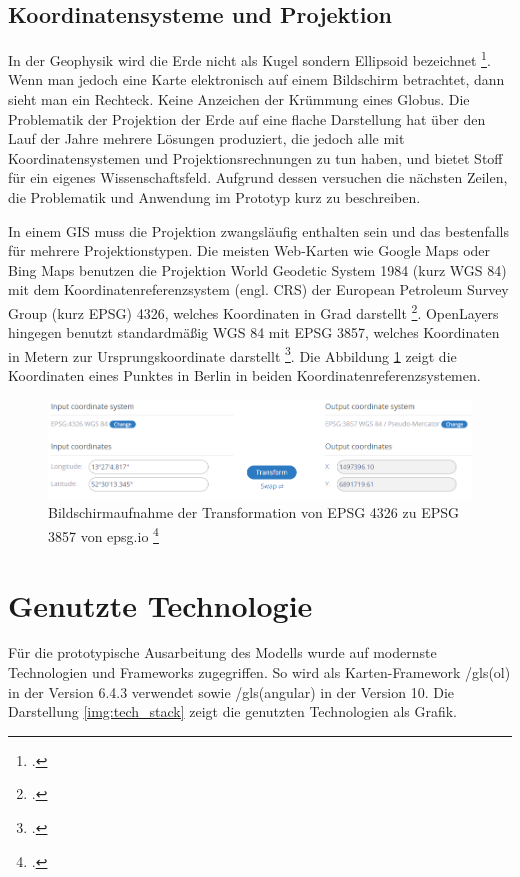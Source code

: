 \subsection{Koordinatensysteme und Projektion}
In der Geophysik wird die Erde nicht als Kugel sondern Ellipsoid bezeichnet \footcite{jung_figur_1956}.
Wenn man jedoch eine Karte elektronisch auf einem Bildschirm betrachtet, dann sieht man ein Rechteck.
Keine Anzeichen der Krümmung eines Globus.
Die Problematik der Projektion der Erde auf eine flache Darstellung hat über den Lauf der Jahre mehrere Lösungen produziert, die jedoch alle mit Koordinatensystemen und Projektionsrechnungen zu tun haben, und bietet Stoff für ein eigenes Wissenschaftsfeld.
Aufgrund dessen versuchen die nächsten Zeilen, die Problematik und Anwendung im Prototyp kurz zu beschreiben.

In einem GIS muss die Projektion zwangsläufig enthalten sein und das bestenfalls für mehrere Projektionstypen.
Die meisten Web-Karten wie Google Maps oder Bing Maps benutzen die Projektion World Geodetic System 1984 (kurz WGS 84) mit dem Koordinatenreferenzsystem (engl. CRS) der European Petroleum Survey Group (kurz EPSG) 4326, welches Koordinaten in Grad darstellt \footcite{epsg.io_4326}.
OpenLayers hingegen benutzt standardmäßig WGS 84 mit EPSG 3857, welches Koordinaten in Metern zur Ursprungskoordinate darstellt \footcite{epsg.io_3857}.
Die Abbildung \ref{img:epsg.io} zeigt die Koordinaten eines Punktes in Berlin in beiden Koordinatenreferenzsystemen.

\begin{figure}[H]
	\centering
	\includegraphics[scale=0.6]{resources/images/projection_epsg.png}
	\caption{Bildschirmaufnahme der Transformation  von EPSG 4326 zu EPSG 3857 von epsg.io \footcite{epsg.io_transform}}
	\label{img:epsg.io}
\end{figure}



\section{Genutzte Technologie}
Für die prototypische Ausarbeitung des Modells wurde auf modernste Technologien und Frameworks zugegriffen. So wird als Karten-Framework /gls(ol) in der Version 6.4.3 verwendet sowie /gls(angular) in der Version 10.
Die Darstellung \ref{img:tech_stack} zeigt die genutzten Technologien als Grafik.

